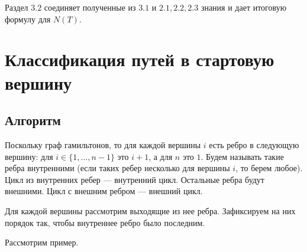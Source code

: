 \documentclass{article}
\begin{document}
Раздел $3.2$ соединяет полученные из $3.1$ и $2.1, 2.2, 2.3$ знания и дает итоговую формулу для $N(T)$.





\section{Классификация путей в стартовую вершину}

\subsection{Алгоритм}

Поскольку граф гамильтонов, то для каждой вершины $i$ есть ребро в следующую вершину: для $i \in \{1, \ldots, n - 1\}$ это $i + 1$, а для $n$ это $1$. 
Будем называть такие ребра внутренними (если таких ребер несколько для вершины $i$, то берем любое). Цикл из внутренних ребер --- внутренний цикл. Остальные ребра будут внешними. Цикл с внешним ребром --- внешний цикл.

Для каждой вершины рассмотрим выходящие из нее ребра. Зафиксируем на них порядок так, чтобы внутреннее ребро было последним.

Рассмотрим пример.
\end{document}
